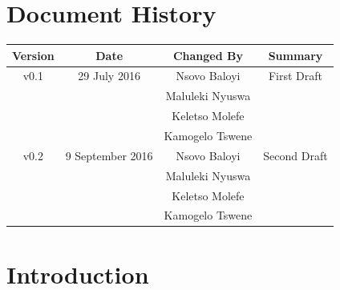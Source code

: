 \documentclass[a4paper,12pt]{article}
\begin{document}
	\newpage
	
	\tableofcontents
	\newpage
	
	
	\section*{Document History}
	
	\begin{table}[h!]
		
		\centering %
		\begin{tabular}{c c c c} %
			\hline\hline %
			Version & Date & Changed By & Summary \\ [0.5ex] %
			\hline %
			v0.1 & 29 July 2016 & Nsovo Baloyi & First Draft 
			\\ & & Maluleki Nyuswa &  
			\\ & & Keletso Molefe &
			\\ & & Kamogelo Tswene & \\ [1ex] 
			\hline
			v0.2 & 9 September 2016 	& Nsovo Baloyi 		& Second Draft 
			\\ & 				& Maluleki Nyuswa 	&  
			\\ & 				& Keletso Molefe 	&
			\\ & 				& Kamogelo Tswene 	& \\ [1ex] 
			\hline\hline
		\end{tabular}
		\label{table:nonlin} %
	\end{table}

	\newpage
	
	\section{Introduction}	
	
	
	
	
\end{document}

